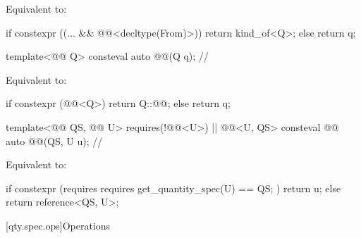 \begin{itemdescr}
\pnum
\effects
Equivalent to:
\begin{codeblock}
if constexpr ((... && @@<decltype(From)>))
  return kind_of<Q{}>;
else
  return q;
\end{codeblock}
\end{itemdescr}

\begin{itemdecl}
template<@@ Q>
consteval auto @@(Q q);                   // \expos
\end{itemdecl}

\begin{itemdescr}
\pnum
\effects
Equivalent to:
\begin{codeblock}
if constexpr (@@<Q>)
  return Q::@@;
else
  return q;
\end{codeblock}
\end{itemdescr}

\begin{itemdecl}
template<@@ QS, @@ U>
  requires(!@@<U>) || @@<U, QS{}>
consteval @@ auto @@(QS, U u);  // \expos
\end{itemdecl}

\begin{itemdescr}
\pnum
\effects
Equivalent to:
\begin{codeblock}
if constexpr (requires { requires get_quantity_spec(U{}) == QS{}; })
  return u;
else
  return reference<QS, U>{};
\end{codeblock}
\end{itemdescr}

[qty.spec.ops]{Operations}

